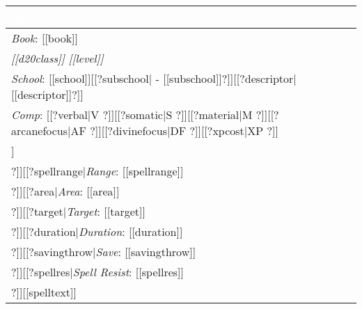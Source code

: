 \noindent
\begin{supertabular}{p{9cm}}
\vspace{1mm}\sf\Large\textbf{\textcolor{white}{[[name]]}} \\
\hline
\textit{Book}: [[book]] \\
\hline
\textit{[[d20class]] [[level]]}\\
\hline
\textit{School}: [[school]][[?subschool| - [[subschool]]?]][[?descriptor| [[descriptor]]?]]\\
\hline
\textit{Comp}: [[?verbal|V ?]][[?somatic|S ?]][[?material|M ?]][[?arcanefocus|AF ?]][[?divinefocus|DF ?]][[?xpcost|XP ?]]\\
\hline
[[?castingtime|\textit{Casting Time}: [[castingtime]] \\
\hline
?]][[?spellrange|\textit{Range}: [[spellrange]] \\
\hline
?]][[?area|\textit{Area}: [[area]] \\
\hline
?]][[?target|\textit{Target}: [[target]] \\
\hline
?]][[?duration|\textit{Duration}: [[duration]] \\
\hline
?]][[?savingthrow|\textit{Save}: [[savingthrow]] \\
\hline
?]][[?spellres|\textit{Spell Resist}: [[spellres]] \\
\hline
?]][[spelltext]]\\
\end{supertabular}

